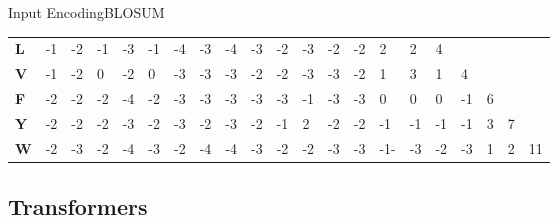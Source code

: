 \documentclass[10pt]{beamer}
\newcommand{\1}{
	\setbeamertemplate{background}{
		\texttt{[image: ../img/1]}
		\tikz[overlay] \fill[fill opacity=0.75,fill=white] (0,0) rectangle (-\paperwidth,\paperheight);
	}
}
\begin{document}
\begin{frame}{Input Encoding}{BLOSUM}
\begin{table}[]
{\begin{tabular}{lllllllllllllllllllll}
					\textbf{L} & -1         & -2         & -1         & -3         & -1         & -4         & -3         & -4         & -3         & -2         & -3         & -2         & -2         & 2          & 2          & 4          &            &            &            &            \\
					\textbf{V} & -1         & -2         & 0          & -2         & 0          & -3         & -3         & -3         & -2         & -2         & -3         & -3         & -2         & 1          & 3          & 1          & 4          &            &            &            \\
					\textbf{F} & -2         & -2         & -2         & -4         & -2         & -3         & -3         & -3         & -3         & -3         & -1         & -3         & -3         & 0          & 0          & 0          & -1         & 6          &            &            \\
					\textbf{Y} & -2         & -2         & -2         & -3         & -2         & -3         & -2         & -3         & -2         & -1         & 2          & -2         & -2         & -1         & -1         & -1         & -1         & 3          & 7          &            \\
					\textbf{W} & -2         & -3         & -2         & -4         & -3         & -2         & -4         & -4         & -3         & -2         & -2         & -3         & -3         & -1-        & -3         & -2         & -3         & 1          & 2          & 11        
				\end{tabular}
				
			}
		\end{table}
		
	\end{frame}
	
	
	
	\subsection{Transformers }
	
\end{document}
